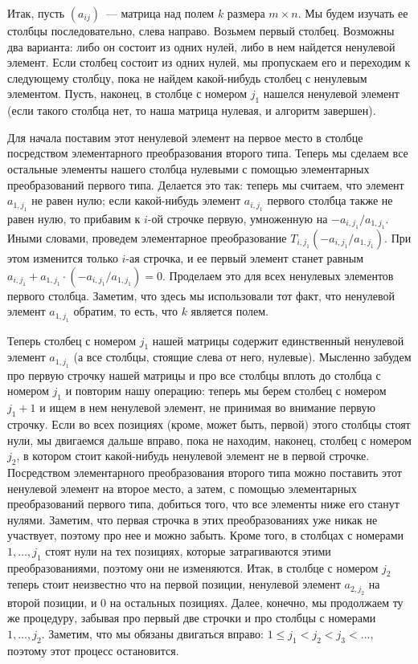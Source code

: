 Итак, пусть $(a_{ij})$~--- матрица над полем $k$ размера $m\times n$.
Мы будем изучать ее столбцы
последовательно, слева направо. Возьмем первый столбец. Возможны два
варианта: либо он состоит из одних нулей, либо в нем найдется
ненулевой элемент. Если столбец состоит из одних нулей, мы пропускаем
его и переходим к следующему столбцу, пока не найдем какой-нибудь
столбец с ненулевым элементом. Пусть, наконец, в столбце с номером
$j_1$ нашелся ненулевой элемент (если такого столбца нет, то наша
матрица нулевая, и алгоритм завершен).

Для начала поставим этот ненулевой элемент на первое
место в столбце посредством элементарного преобразования второго
типа. Теперь мы сделаем все остальные элементы нашего столбца нулевыми
с помощью элементарных преобразований первого типа. Делается это так:
теперь мы считаем, что элемент $a_{1,j_1}$ не равен нулю; если
какой-нибудь элемент $a_{i,j_1}$ первого столбца также не равен нулю, то
прибавим к $i$-ой строчке первую, умноженную на
$-a_{i,j_1}/a_{1,j_1}$. Иными словами, проведем элементарное преобразование
$T_{i,j_1}(-a_{i,j_1}/a_{1,j_1})$. При этом изменится только $i$-ая строчка, и
ее первый элемент станет равным
$a_{i,j_1}+a_{1,j_1}\cdot(-a_{i,j_1}/a_{1,j_1})=0$. Проделаем это для всех
ненулевых элементов первого столбца. Заметим, что здесь мы
использовали тот факт, что ненулевой элемент $a_{1,j_1}$ обратим, то
есть, что $k$ является полем.

Теперь столбец с номером $j_1$ нашей матрицы содержит единственный
ненулевой элемент $a_{1,j_1}$ (а все столбцы, стоящие слева от него,
нулевые).
Мысленно забудем про первую строчку нашей матрицы и про все столбцы
вплоть до столбца с номером $j_1$ и повторим нашу операцию: теперь мы
берем столбец с номером $j_1+1$ и ищем в нем ненулевой элемент, не
принимая во внимание первую строчку. Если во всех позициях (кроме,
может быть, первой) этого столбцы стоят нули, мы двигаемся дальше
вправо, пока не находим, наконец, столбец с номером $j_2$, в котором
стоит какой-нибудь ненулевой элемент не в первой строчке. Посредством
элементарного преобразования второго типа можно поставить этот
ненулевой элемент на второе место, а затем, с помощью элементарных
преобразований первого типа, добиться того, что все элементы ниже его
станут нулями. Заметим, что первая строчка в этих преобразованиях уже
никак не участвует, поэтому про нее и можно забыть. Кроме того, в
столбцах с номерами $1,\dots,j_1$ стоят нули на тех позициях, которые
затрагиваются этими преобразованиями, поэтому они не изменяются. Итак,
в столбце с номером $j_2$ теперь стоит неизвестно что на первой
позиции, ненулевой элемент $a_{2,j_2}$ на второй позиции, и $0$ на
остальных позициях. Далее, конечно, мы продолжаем ту же процедуру,
забывая про первый две строчки и про столбцы с номерами
$1,\dots,j_2$. Заметим, что мы обязаны двигаться вправо: $1\leq
j_1<j_2<j_3<\dots$, поэтому этот процесс остановится.

